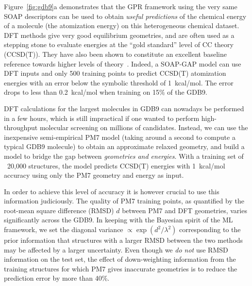 \documentclass[12pt]{article}
\begin{document}
Figure~\ref{fig:gdb9}a demonstrates that the
GPR framework using the very same SOAP descriptors can be
used to obtain \emph{useful predictions} of the chemical
energy of a molecule (the atomization energy) on this %
heterogeneous chemical dataset. 
DFT methods give very good equilibrium geometries,
and are often used as a stepping stone to evaluate energies at the
``gold standard'' level of CC theory (CCSD(T)). They have also been
shown to constitute an excellent baseline reference 
towards higher levels of theory~\cite{rama+15jctc}.
%
%
%
%
%
%
%
%
%
%
%
Indeed, a SOAP-GAP model can use 
DFT inputs and only 500 training points 
to predict CCSD(T) atomization energies with an 
error below the symbolic threshold of 1~kcal/mol. 
The error drops to less than 0.2~kcal/mol when training on 
15\%{} of the GDB9.


DFT calculations for the largest molecules in GDB9 can nowadays
be performed in a few hours, which is still impractical if one 
wanted to perform high-throughput molecular screening on millions 
of candidates. 
%
%
%
%
%
%
%
Instead, we can use the inexpensive semi-empirical PM7 model 
(taking around a second to compute a typical GDB9 molecule) to obtain 
an approximate relaxed geometry, and build a model to bridge the gap 
between {\em geometries and energies}\cite{rama+15jctc}. With a training 
set of ~20,000 structures, the model predicts CCSD(T) energies with 
1~kcal/mol accuracy using only the PM7 geometry and energy as input. 

In order to achieve this
level of accuracy it is however
crucial to use this information
judiciously. 
%
%
%
%
%
%
%
%
%
%
The quality of PM7 training points,
as quantified by the root-mean square difference (RMSD) $d$ 
between PM7 and DFT geometries, varies significantly across the GDB9.
 In keeping with the Bayesian spirit of the ML framework,
we set the diagonal variance 
$\propto \exp (d^2/\lambda^2)$
corresponding to the prior information that structures with a larger RMSD 
between the two methods may be affected by a larger 
uncertainty. Even though we {\em do not} use RMSD information
on the test set, the effect of down-weighting  information from the training
structures for which PM7 gives inaccurate geometries 
is to reduce the prediction error by more than 40\%{}. 
\end{document}
